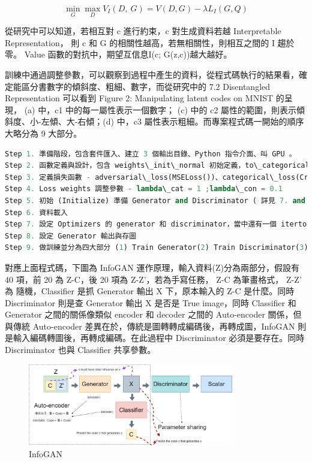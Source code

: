\documentclass[10pt,UTF8]{ctexart}
\begin{document}
$$\min \limits_{G}\max \limits_{D}{V_I(D,\ G)=V(D,G)-\lambda L_I(G,Q)}$$

從研究中可以知道，若相互對 c 進行約束，c 對生成資料若越 Interpretable Representation， 則 c 和 G 的相關性越高，若無相關性，則相互之間的 I 趨於零。 Value 函數的對抗中，期望互信息I(c; G(z,c))越大越好。

訓練中通過調整參數，可以觀察到過程中產生的資料，從程式碼執行的結果看，確定能區分書數字的傾斜度、粗細、數字，而從研究中的 7.2 Disentangled Representation 可以看到 Figure 2: Manipulating latent codes on MNIST 的呈現， (a) 中，c1 中的每一屬性表示一個數字； (c) 中的 c2 屬性的範圍，則表示傾斜度、小-左傾、大-右傾；(d) 中，c3 屬性表示粗細。而專案程式碼一開始的順序大略分為 9 大部分。

	\begin{lstlisting}[language={python}]
Step 1. 準備階段，包含套件匯入、建立 3 個輸出目錄、Python 指令介面、叫 GPU 。
Step 2. 函數定義與設計，包含 weights\_init\_normal 初始定義，to\_categorical 分類，定義 Generator(nn.Module): [Generator]，定義 Discriminator(nn.Module): [Discriminator]。
Step 3. 定義損失函數 - adversarial\_loss(MSELoss())、categorical\_loss(CrossEntropyLoss())、continuous\_loss (MSELoss())。
Step 4. Loss weights 調整參數 - lambda\_cat = 1 ;lambda\_con = 0.1
Step 5. 初始 (Initialize) 準備 Generator and Discriminator ( 詳見 7. and 8.)、GPU CUDA 判斷、資料載入，包含當中 Generator 和 Discriminator 的 weights
Step 6. 資料載入
Step 7. 設定 Optimizers 的 generator 和 discriminator，當中還有一個 itertools 做迭代，使用 Adam。
Step 8. 設定 Generator 輸出與存圖
Step 9. 做訓練並分為四大部分 (1) Train Generator(2) Train Discriminator(3) Information Loss(4) Log Progress
	\end{lstlisting}
	對應上面程式碼，下圖為 InfoGAN 運作原理，輸入資料(Z)分為兩部分，假設有 40 項，前 20 為 Z-C，後 20 項為 Z-Z'，若為手寫任務， Z-C 為筆畫格式， Z-Z' 為 隨機，Classifier 是抓 Generator 輸出 X 下，原本輸入的 Z-C 是什麼。同時 Discriminator 則是查 Generator 輸出 X 是否是 True image，同時 Classifier 和 Generator 之間的關係像類似 encoder 和 decoder 之間的 Auto-encoder 關係，但與傳統 Auto-encoder 差異在於，傳統是圖轉轉成編碼後，再轉成圖，InfoGAN 則是輸入編碼轉圖後，再轉成編碼。在此過程中 Discriminator 必須是要存在。同時 Discriminator 也與 Classifier 共享參數。
\begin{figure}[H]
\centering 
\includegraphics[width=0.80\textwidth]{su3.png} 
\caption{InfoGAN}
\label{Test}
\end{figure}


\clearpage
\end{document}
